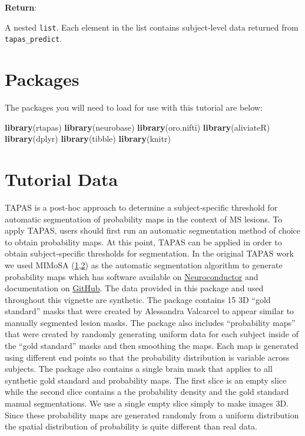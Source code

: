 \documentclass[]{article}
\newenvironment{Shaded}{\begin{snugshade}}{\end{snugshade}}
\newcommand{\KeywordTok}[1]{\textcolor[rgb]{0.13,0.29,0.53}{\textbf{#1}}}
\newcommand{\NormalTok}[1]{#1}
\begin{document}
\textbf{Return}:

A nested \texttt{list}. Each element in the list contains subject-level
data returned from \texttt{tapas\_predict}.

\hypertarget{packages}{%
\section{Packages}\label{packages}}

The packages you will need to load for use with this tutorial are below:

\begin{Shaded}
\begin{Highlighting}[]
\KeywordTok{library}\NormalTok{(rtapas)}
\KeywordTok{library}\NormalTok{(neurobase)}
\KeywordTok{library}\NormalTok{(oro.nifti)}
\KeywordTok{library}\NormalTok{(aliviateR)}
\KeywordTok{library}\NormalTok{(dplyr)}
\KeywordTok{library}\NormalTok{(tibble)}
\KeywordTok{library}\NormalTok{(knitr)}
\end{Highlighting}
\end{Shaded}

\hypertarget{tutorial-data}{%
\section{Tutorial Data}\label{tutorial-data}}

TAPAS is a post-hoc approach to determine a subject-specific threshold
for automatic segmentation of probability maps in the context of MS
lesions. To apply TAPAS, users should first run an automatic
segmentation method of choice to obtain probability maps. At this point,
TAPAS can be applied in order to obtain subject-specific thresholds for
segmentation. In the original TAPAS work we used MIMoSA
(\href{https://onlinelibrary.wiley.com/doi/full/10.1111/jon.12506}{1},\href{https://www.sciencedirect.com/science/article/pii/S2213158218303231}{2})
as the automatic segmentation algorithm to generate probability maps
which has software available on
\href{https://neuroconductor.org/package/mimosa}{Neuroconductor} and
documentation on
\href{https://github.com/avalcarcel9/mimosa/blob/master/vignettes/mimosa_git.md}{GitHub}.
The data provided in this package and used throughout this vignette are
synthetic. The package contains 15 3D ``gold standard'' masks that were
created by Alessandra Valcarcel to appear similar to manually segmented
lesion masks. The package also includes ``probability maps'' that were
created by randomly generating uniform data for each subject inside of
the ``gold standard'' masks and then smoothing the maps. Each map is
generated using different end points so that the probability
distribution is variable across subjects. The package also contains a
single brain mask that applies to all synthetic gold standard and
probability maps. The first slice is an empty slice while the second
slice contains a the probability density and the gold standard manual
segmentations. We use a single empty slice simply to make images 3D.
Since these probability maps are generated randomly from a uniform
distribution the spatial distribution of probability is quite different
than real data.
\end{document}

